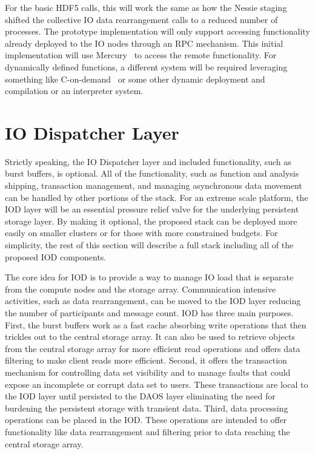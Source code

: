 \documentclass[conference]{IEEEtran} \pdfpagewidth=8.5in
\begin{document}
For the basic HDF5 calls, this will work the same as how the Nessie
staging~\cite{lofstead:2011:nessie-staging} shifted the collective IO data
rearrangement calls to a reduced number of processes. The prototype
implementation will only support accessing functionality already deployed to
the IO nodes through an RPC mechanism. This initial implementation will use
Mercury~\cite{Soumagne:2013:mercury} to access the remote functionality. For
dynamically defined functions, a different system will be required leveraging
something like C-on-demand~\cite{abbasi:2011:c-on-demand} or some other dynamic
deployment and compilation or an interpreter system.

\section{IO Dispatcher Layer}
\label{sec:iod}

Strictly speaking, the IO Dispatcher layer and included functionality, such as
burst buffers, is optional. All of the functionality, such as function and
analysis shipping, transaction management, and managing asynchronous data
movement can be handled by other portions of the stack. For an extreme scale
platform, the IOD layer will be an essential pressure relief valve for the
underlying persistent storage layer. By making it optional, the proposed stack
can be deployed more easily on smaller clusters or for those with more
constrained budgets. For simplicity, the rest of this section will describe a
full stack including all of the proposed IOD components.

The core idea for IOD is to provide a way to manage IO load that is
separate from the compute nodes and the storage array. Communication intensive
activities, such as data rearrangement, can be moved to the IOD layer
reducing the number of participants and message count. IOD has three main
purposes. First, the burst buffers work as a fast cache absorbing write
operations that then trickles out to the central storage array. It can also
be used to retrieve objects from the central storage array for more efficient
read operations and offers data filtering to make client reads more efficient.
Second, it offers the transaction mechanism for controlling data set visibility
and to manage faults that could expose an incomplete or corrupt data set to
users. These transactions are local to the IOD layer until persisted to the
DAOS layer eliminating the need for burdening the persistent storage with
transient data.  Third, data processing operations can be placed in the IOD.
These operations are intended to offer functionality like data rearrangement
and filtering prior to data reaching the central storage array.
\end{document}
